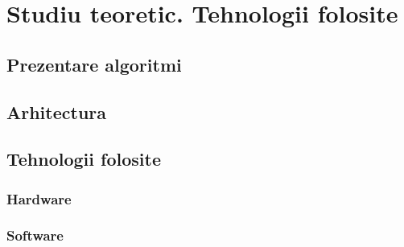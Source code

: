 \chapter{Studiu teoretic. Tehnologii folosite}\label{ch:2studiu_teoretic}
\section{Prezentare algoritmi}
\section{Arhitectura}
\section{Tehnologii folosite}
\subsection{Hardware}
\subsection{Software}